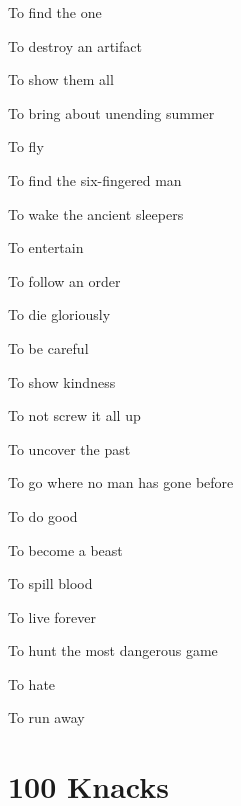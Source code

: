  
\item To find the one

 
\item To destroy an artifact

 
\item To show them all

 
\item To bring about unending summer

 
\item To fly

 
\item To find the six-fingered man

 
\item To wake the ancient sleepers

 
\item To entertain

 
\item To follow an order

 
\item To die gloriously

 
\item To be careful

 
\item To show kindness

 
\item To not screw it all up

 
\item To uncover the past

 
\item To go where no man has gone before

 
\item To do good

 
\item To become a beast

 
\item To spill blood

 
\item To live forever

 
\item To hunt the most dangerous game

 
\item To hate

 
\item To run away


\stopitemize
 
\section{100 Knacks}    
 
